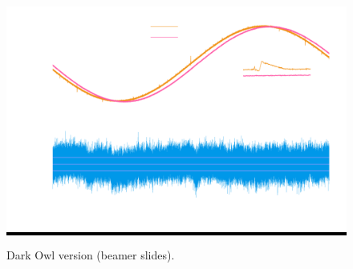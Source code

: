 \documentclass[11pt,letterpaper]{article}
\begin{document}
\begin{figure}[H]
  \centering
  \colorbox{black}{%
    \includegraphics[width=\linewidth]{../diffplot-do.png}
  }
  \caption{Dark Owl version (beamer slides).}
\end{figure}
\end{document}
